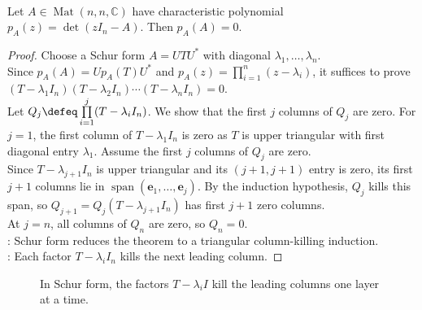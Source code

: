 \begin{theorem} \label{thm:cayley-hamilton-matrix} \\
Let $A\in\operatorname{Mat}(n,n,\mathbb{C})$ have characteristic polynomial $p_A(z)=\det(zI_n-A)$. Then $p_A(A)=0$.
\begin{proof}
Choose a Schur form $A=UTU^*$ with diagonal $\lambda_1,\ldots,\lambda_n$.\\
Since $p_A(A)=Up_A(T)U^*$ and $p_A(z)=\prod_{i=1}^{n}(z-\lambda_i)$, it suffices to prove $(T-\lambda_1I_n)(T-\lambda_2I_n)\cdots(T-\lambda_nI_n)=0$.\\
Let $Q_j\defeq\prod\limits_{i=1}^{j}(T-\lambda_iI_n)$. We show that the first $j$ columns of $Q_j$ are zero. For $j=1$, the first column of $T-\lambda_1I_n$ is zero as $T$ is upper triangular with first diagonal entry $\lambda_1$. Assume the first $j$ columns of $Q_j$ are zero.\\
Since $T-\lambda_{j+1}I_n$ is upper triangular and its $(j+1,j+1)$ entry is zero, its first $j+1$ columns lie in $\operatorname{span}(\mathbf{e}_1,\ldots,\mathbf{e}_j)$. By the induction hypothesis, $Q_j$ kills this span, so $Q_{j+1}=Q_j(T-\lambda_{j+1}I_n)$ has first $j+1$ zero columns.\\
At $j=n$, all columns of $Q_n$ are zero, so $Q_n=0$.\\
: Schur form reduces the theorem to a triangular column-killing induction.\\
: Each factor $T-\lambda_iI_n$ kills the next leading column.
\end{proof}
\end{theorem}

\begin{figure}[H]
  \centering
  
\caption{In Schur form, the factors $T-\lambda_iI$ kill the leading columns one layer at a time.}
  \label{fig:cayley-hamilton-triangular-killing}
\end{figure}


